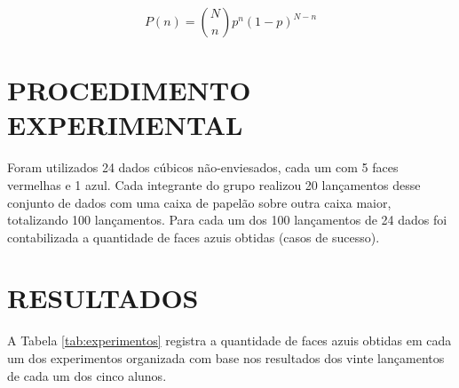 \documentclass[12pt, a4paper, brazil]{article}
\begin{document}
\begin{equation}\label{eq:distbin}
	P(n) = \binom{N}{n}p^n(1-p)^{N-n}
\end{equation}

\section{PROCEDIMENTO EXPERIMENTAL}
Foram utilizados 24 dados cúbicos não-enviesados, cada um com 5 faces vermelhas e 1 azul. Cada integrante do grupo realizou 20 lançamentos desse conjunto de dados com uma caixa de papelão sobre outra caixa maior, totalizando 100 lançamentos. Para cada um dos 100 lançamentos de 24 dados foi contabilizada a quantidade de faces azuis obtidas (casos de sucesso). 

\section{RESULTADOS}

A Tabela \ref{tab:experimentos} registra a quantidade de faces azuis obtidas em cada um dos experimentos organizada com base nos resultados dos vinte lançamentos de cada um dos cinco alunos.
\end{document}
